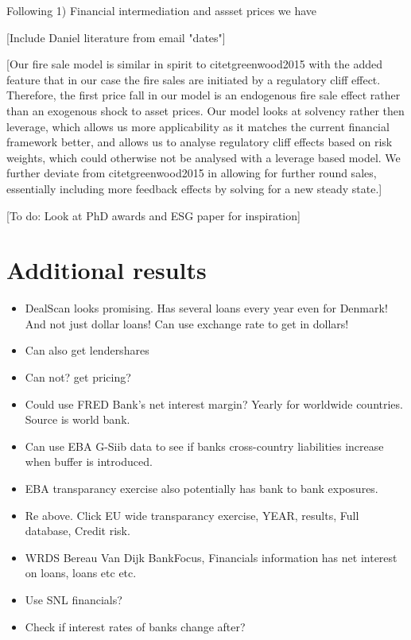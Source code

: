 \documentclass[11pt]{article}
\begin{document}
\begin{appendices}
Following 1) Financial intermediation and assset prices we have 

[Include Daniel literature from email "dates"]


[Our fire sale model is similar in spirit to citet{greenwood2015} with the added feature that in our case the fire sales are initiated by a regulatory cliff effect. Therefore, the first price fall in our model is an endogenous fire sale effect rather than an exogenous shock to asset prices. Our model looks at solvency rather then leverage, which allows us more applicability as it matches the current financial framework better, and allows us to analyse regulatory cliff effects based on risk weights, which could otherwise not be analysed with a leverage based model. We further deviate from citet{greenwood2015} in allowing for further round sales, essentially including more feedback effects by solving for a new steady state.]

[To do: Look at PhD awards and ESG paper for inspiration]



\section{Additional results}
\begin{itemize}
\item DealScan looks promising. Has several loans every year even for Denmark! And not just dollar loans! Can use exchange rate to get in dollars!
\item Can also get lendershares
\item Can not? get pricing?
\item Could use FRED Bank's net interest margin? Yearly for worldwide countries. Source is world bank.
\item Can use EBA G-Siib data to see if banks cross-country liabilities increase when buffer is introduced.
\item EBA transparancy exercise also potentially has bank to bank exposures.
\item Re above. Click EU wide transparancy exercise, YEAR, results, Full database, Credit risk.
\item WRDS Bereau Van Dijk BankFocus, Financials information has net interest on loans, loans etc etc.
\item Use SNL financials?
\item Check if interest rates of banks change after?
\end{itemize}


\end{appendices}
\end{document}
